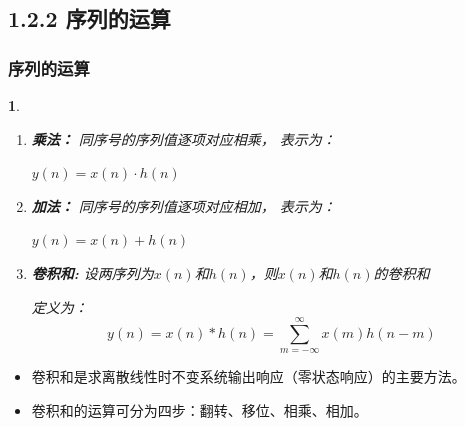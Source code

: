 \documentclass[notheorems,compress,mathserif,table]{beamer}
\newtheorem{dablock}{}
\begin{document}
\subsection{1.2.2 序列的运算}

\begin{frame}[shrink]\frametitle{序列的运算}%
\begin{dablock}
\begin{enumerate}
  \item [(1)]  \textbf{乘法：} 同序号的序列值逐项对应相乘， 表示为：\par \qquad\qquad $y(n) = x(n) \cdot h(n)$
  \item [(2)] \textbf{加法：} 同序号的序列值逐项对应相加， 表示为：\par \qquad\qquad $y(n) = x(n) + h(n)$
  \item [(3)] \textbf{卷积和:} 设两序列为$x(n)$和$h(n)$，则$x(n)$和$h(n)$的卷积和\par
  \qquad \qquad 定义为：
        \begin{equation*}
            y(n) = x(n)*h(n) = \sum_{m=-\infty}^{\infty}x(m)h(n-m)
        \end{equation*}
\end{enumerate}
\end{dablock}
\begin{itemize}
  \item 卷积和是求离散线性时不变系统输出响应（零状态响应）的主要方法。
  \item 卷积和的运算可分为四步：翻转、移位、相乘、相加。
\end{itemize}



\end{frame}
%
%
%
%
%
%
\end{document}
